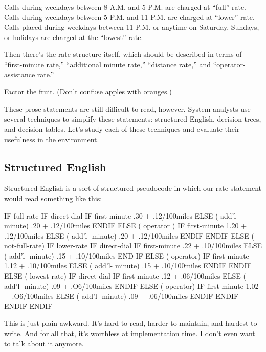 \begin{tfquot}
Calls during weekdays between 8 A.M. and 5 P.M. are charged at ``full'' rate.
Calls during weekdays between 5 P.M. and 11 P.M. are charged at ``lower''
rate. Calls placed during weekdays between 11 P.M. or anytime on Saturday,
Sundays, or holidays are charged at the ``lowest'' rate.
\end{tfquot}
Then there's the rate structure itself, which should be described in
terms of ``first-minute rate,'' ``additional minute rate,'' ``distance
rate,'' and ``operator-assistance rate.''

\begin{tip}
Factor the fruit. (Don't confuse apples with oranges.)
\end{tip}
These prose statements are still difficult to read, however. System
analysts use several techniques to simplify these statements:
structured English, decision trees, and decision tables. Let's study
each of these techniques and evaluate their usefulness in the \Forth{}
environment.

\subsection{Structured English}%
%

Structured English is a sort of structured pseudocode in which our rate
statement would read something like this:

\begin{Code}[baselinestretch=0.95]
IF full rate
   IF direct-dial
      IF first-minute
	 .30 + .12/100miles
      ELSE ( add'l- minute)
	 .20 + .12/100miles
      ENDIF
   ELSE ( operator )
      IF first-minute
	 1.20 + .12/100miles
      ELSE ( add'l- minute)
	 .20 + .12/100miles
      ENDIF
   ENDIF
ELSE  ( not-full-rate)
   IF lower-rate
      IF direct-dial
	 IF first-minute
	    .22 + .10/100miles
	 ELSE ( add'l- minute)
	    .15 + .10/100miles
	 END IF
      ELSE ( operator)
	 IF first-minute
	    1.12 + .10/100miles
	 ELSE ( add'l- minute)
	    .15 + .10/100miles
	 ENDIF
      ENDIF
   ELSE ( lowest-rate)
      IF direct-dial
	 IF first-minute
	    .12 + .06/100miles
	 ELSE ( add'l- minute)
	    .09 + .O6/100miles
	 ENDIF
      ELSE ( operator)
	 IF first-minute
	    1.02 + .O6/100miles
	 ELSE ( add'l- minute)
	    .09 + .06/100miles
	 ENDIF
      ENDIF
   ENDIF
ENDIF
\end{Code}
This is just plain awkward. It's hard to read, harder to maintain, and
hardest to write. And for all that, it's worthless at implementation
time. I don't even want to talk about it anymore.%
%

